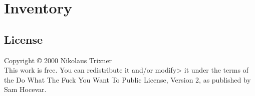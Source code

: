 \documentclass[a4paper]{book}
\begin{document}
    \part{Inventory}\label{part:inventory}
    
    

    \begin{appendices}
        
        
        

        \chapter{License}\label{chapter:license}
        Copyright © 2000 Nikolaus Trixner\\
        This work is free.
        You can redistribute it and/or modify> it under the terms of the Do What The Fuck You Want To Public License, Version 2, as published by Sam Hocevar.
    \end{appendices}
\end{document}
